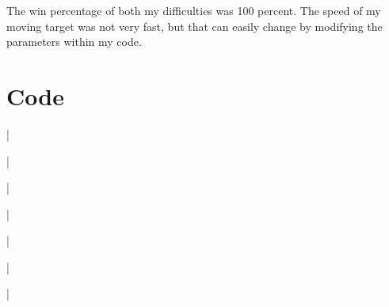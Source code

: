 \documentclass[11pt]{article}
\newcommand{\Verilog}[2][]{%
	
}
\begin{document}
The win percentage of both my difficulties was 100 percent. The speed of my moving target was not very fast, but that can easily change by modifying the parameters within my code.

\section*{Code}

\Verilog[firstline=1, lastline=76, caption=Debounce Module Code]{Lab11_project/codedirectory/debounce.sv}|

\Verilog[firstline=1, lastline=35, caption=Debounce Testbench Code]{Lab11_project/codedirectory/debounce_test.sv}|

\Verilog[firstline=23, lastline=40, caption=Counter Module Code]{Lab11_project/codedirectory/counter.sv}|

\Verilog[firstline=23, lastline=28, caption=MUX Difficulty Module Code]{Lab11_project/codedirectory/mux_diff.sv}|

\Verilog[firstline=23, lastline=120, caption=Guess FSM Module Code]{Lab11_project/codedirectory/guess_FSM.sv}|

\Verilog[firstline=23, lastline=68, caption=Guess FSM Testbench Code]{Lab11_project/codedirectory/guess_FSM_test.sv}|

\Verilog[firstline=23, lastline=109, caption=Guessing Game Module Code]{Lab11_project/codedirectory/guessing_game.sv}|
\end{document}
